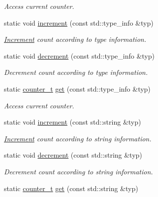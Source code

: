 \begin{DoxyCompactItemize}
\begin{DoxyCompactList}\small\item\em Access current counter. \end{DoxyCompactList}\item 
static void \hyperlink{struct_d_d4hep_1_1_instance_count_a615e3109fee2bdd67d047d4decca1c0f}{increment} (const std\+::type\+\_\+info \&typ)
\begin{DoxyCompactList}\small\item\em \hyperlink{struct_d_d4hep_1_1_increment}{Increment} count according to type information. \end{DoxyCompactList}\item 
static void \hyperlink{struct_d_d4hep_1_1_instance_count_a99ffc259c76fc693c83e8cc493ace1f6}{decrement} (const std\+::type\+\_\+info \&typ)
\begin{DoxyCompactList}\small\item\em Decrement count according to type information. \end{DoxyCompactList}\item 
static \hyperlink{struct_d_d4hep_1_1_instance_count_ae81dc0c76b135425e14b6dc38262a727}{counter\+\_\+t} \hyperlink{struct_d_d4hep_1_1_instance_count_a1b6de9faa3cda69498c13c07ea0f289c}{get} (const std\+::type\+\_\+info \&typ)
\begin{DoxyCompactList}\small\item\em Access current counter. \end{DoxyCompactList}\item 
static void \hyperlink{struct_d_d4hep_1_1_instance_count_a2a6c1324b3462dcd26a7916d6b1ece46}{increment} (const std\+::string \&typ)
\begin{DoxyCompactList}\small\item\em \hyperlink{struct_d_d4hep_1_1_increment}{Increment} count according to string information. \end{DoxyCompactList}\item 
static void \hyperlink{struct_d_d4hep_1_1_instance_count_a5c0cdd835f58abbd7f1d54069b5f04b2}{decrement} (const std\+::string \&typ)
\begin{DoxyCompactList}\small\item\em Decrement count according to string information. \end{DoxyCompactList}\item 
static \hyperlink{struct_d_d4hep_1_1_instance_count_ae81dc0c76b135425e14b6dc38262a727}{counter\+\_\+t} \hyperlink{struct_d_d4hep_1_1_instance_count_aecb1277df454b018fc8144635c3dcb24}{get} (const std\+::string \&typ)

\end{DoxyCompactItemize}

